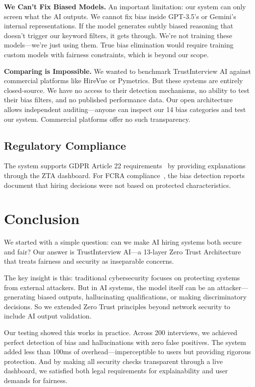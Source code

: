 \documentclass[conference]{IEEEtran}
\begin{document}
\textbf{We Can't Fix Biased Models.} An important limitation: our system can only screen what the AI outputs. We cannot fix bias inside GPT-3.5's or Gemini's internal representations. If the model generates subtly biased reasoning that doesn't trigger our keyword filters, it gets through. We're not training these models—we're just using them. True bias elimination would require training custom models with fairness constraints, which is beyond our scope.

\textbf{Comparing is Impossible.} We wanted to benchmark TrustInterview AI against commercial platforms like HireVue or Pymetrics. But these systems are entirely closed-source. We have no access to their detection mechanisms, no ability to test their bias filters, and no published performance data. Our open architecture allows independent auditing—anyone can inspect our 14 bias categories and test our system. Commercial platforms offer no such transparency.

\subsection{Regulatory Compliance}

The system supports GDPR Article 22 requirements~\cite{garcia2024compliance} by providing explanations through the ZTA dashboard. For FCRA compliance~\cite{thompson2023fcra}, the bias detection reports document that hiring decisions were not based on protected characteristics.

\section{Conclusion}

We started with a simple question: can we make AI hiring systems both secure and fair? Our answer is TrustInterview AI—a 13-layer Zero Trust Architecture that treats fairness and security as inseparable concerns.

The key insight is this: traditional cybersecurity focuses on protecting systems from external attackers. But in AI systems, the model itself can be an attacker—generating biased outputs, hallucinating qualifications, or making discriminatory decisions. So we extended Zero Trust principles beyond network security to include AI output validation.

Our testing showed this works in practice. Across 200 interviews, we achieved perfect detection of bias and hallucinations with zero false positives. The system added less than 100ms of overhead—imperceptible to users but providing rigorous protection. And by making all security checks transparent through a live dashboard, we satisfied both legal requirements for explainability and user demands for fairness.
\end{document}
